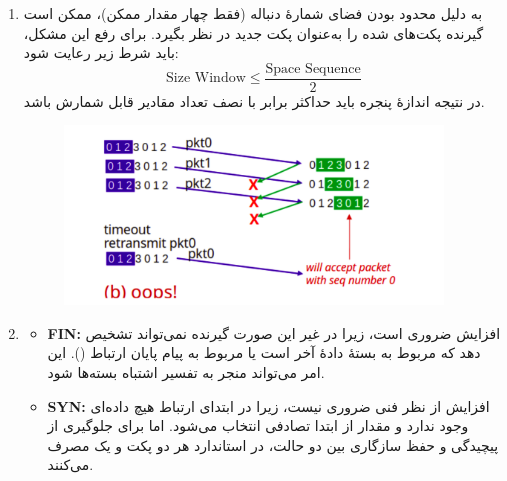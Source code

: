 \begin{enumerate}[label=\alph*)]
\item 
به دلیل محدود بودن فضای شمارهٔ دنباله (فقط چهار مقدار ممکن)، ممکن است گیرنده پکت‌های  شده را به‌عنوان پکت جدید در نظر بگیرد.  
برای رفع این مشکل، باید شرط زیر رعایت شود:
\[
\text{Size Window} \leq \frac{\text{Space Sequence}}{2}
\]
در نتیجه اندازهٔ پنجره باید حداکثر برابر با نصف تعداد مقادیر قابل شمارش  باشد.

\begin{figure}[H]
    \centering
    \includegraphics[width=0.95\textwidth]{Solutions/pics/Q2_4_solution.png}
    \caption{}
    \label{fig:small-example}
\end{figure}

\item 
\begin{itemize}
    \item \textbf{FIN:} افزایش  ضروری است، زیرا در غیر این صورت گیرنده نمی‌تواند تشخیص دهد که  مربوط به بستهٔ دادهٔ آخر است یا مربوط به پیام پایان ارتباط (). این امر می‌تواند منجر به تفسیر اشتباه بسته‌ها شود.
    \item \textbf{SYN:} افزایش  از نظر فنی ضروری نیست، زیرا در ابتدای ارتباط هیچ داده‌ای وجود ندارد و مقدار  از ابتدا تصادفی انتخاب می‌شود.  
    اما برای جلوگیری از پیچیدگی و حفظ سازگاری بین دو حالت، در استاندارد  هر دو پکت  و  یک  مصرف می‌کنند.
\end{itemize}

\end{enumerate}